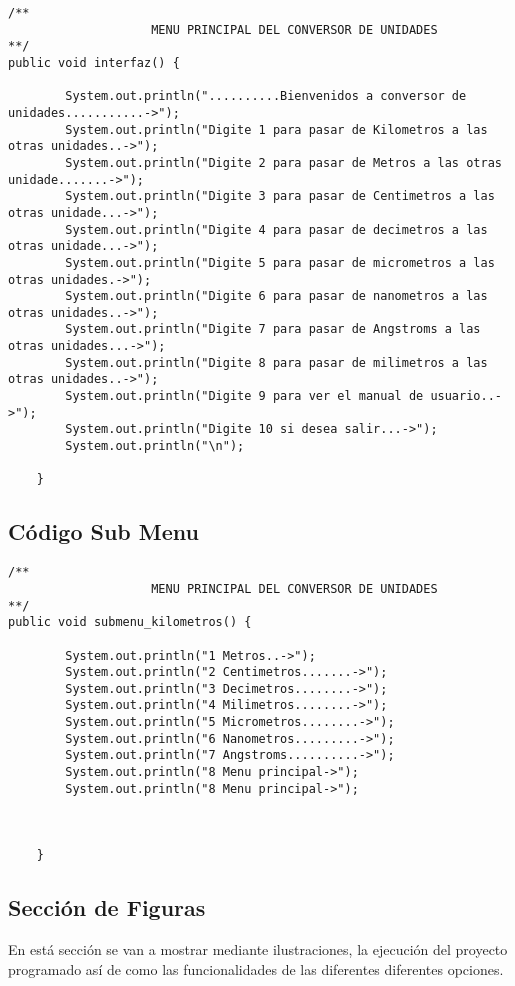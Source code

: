 \documentclass[times,12pt]{article}
\begin{document}
\begin{lstlisting}
/**
					MENU PRINCIPAL DEL CONVERSOR DE UNIDADES
**/
public void interfaz() {

		System.out.println("..........Bienvenidos a conversor de unidades...........->");
		System.out.println("Digite 1 para pasar de Kilometros a las otras unidades..->");
		System.out.println("Digite 2 para pasar de Metros a las otras unidade.......->");
		System.out.println("Digite 3 para pasar de Centimetros a las otras unidade...->");
		System.out.println("Digite 4 para pasar de decimetros a las otras unidade...->");
		System.out.println("Digite 5 para pasar de micrometros a las otras unidades.->");
		System.out.println("Digite 6 para pasar de nanometros a las otras unidades..->");
		System.out.println("Digite 7 para pasar de Angstroms a las otras unidades...->");
		System.out.println("Digite 8 para pasar de milimetros a las otras unidades..->");
		System.out.println("Digite 9 para ver el manual de usuario..->");
		System.out.println("Digite 10 si desea salir...->");
		System.out.println("\n");

	}

\end{lstlisting}

\subsection{C\'odigo Sub Menu}

\begin{lstlisting}
/**
					MENU PRINCIPAL DEL CONVERSOR DE UNIDADES
**/
public void submenu_kilometros() {

		System.out.println("1 Metros..->");
		System.out.println("2 Centimetros.......->");
		System.out.println("3 Decimetros........->");
		System.out.println("4 Milimetros........->");
		System.out.println("5 Micrometros........->");
		System.out.println("6 Nanometros.........->");
		System.out.println("7 Angstroms..........->");
		System.out.println("8 Menu principal->");
		System.out.println("8 Menu principal->");
		
		

	}

\end{lstlisting}


\subsection{Secci\'on de Figuras}

En est\'a secci\'on se van a mostrar mediante ilustraciones, la ejecuci\'on del proyecto programado as\'i de como las funcionalidades de las diferentes diferentes opciones. 
\end{document}
